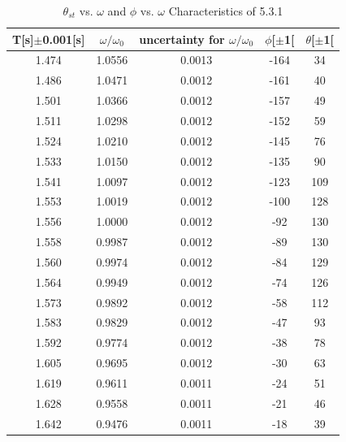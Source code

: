 \documentclass[12pt,a4paper]{article}
\begin{document}
\begin{table}[H]
    \centering
    \begin{tabular}{|c|c|c|c|c|}
    \hline
    T[s]$\pm$0.001[s]& $\omega/\omega_0$ & uncertainty for $\omega/\omega_0$ & $\phi${[}\degree{]}$\pm$1{[}\degree{]} & $\theta${[}\degree{]}$\pm$1{[}\degree{]} \\ \hline
    1.474 & 1.0556& 0.0013& -164& 34   \\ \hline
    1.486 & 1.0471& 0.0012& -161& 40   \\ \hline
    1.501 & 1.0366& 0.0012& -157& 49   \\ \hline
    1.511 & 1.0298& 0.0012& -152& 59   \\ \hline
    1.524 & 1.0210& 0.0012& -145& 76   \\ \hline
    1.533 & 1.0150& 0.0012& -135& 90   \\ \hline
    1.541 & 1.0097& 0.0012& -123& 109  \\ \hline
    1.553 & 1.0019& 0.0012& -100& 128  \\ \hline
    1.556 & 1.0000& 0.0012& -92& 130  \\ \hline
    1.558 & 0.9987& 0.0012& -89& 130  \\ \hline
    1.560  & 0.9974& 0.0012& -84& 129  \\ \hline
    1.564 & 0.9949& 0.0012& -74& 126  \\ \hline
    1.573 & 0.9892& 0.0012& -58& 112  \\ \hline
    1.583 & 0.9829& 0.0012& -47& 93   \\ \hline
    1.592 & 0.9774& 0.0012& -38& 78   \\ \hline
    1.605 & 0.9695& 0.0012
    & -30& 63   \\ \hline
    1.619 & 0.9611& 0.0011
    & -24& 51   \\ \hline
    1.628 & 0.9558& 0.0011
    & -21& 46   \\ \hline
    1.642 & 0.9476& 0.0011
    & -18& 39   \\ \hline
    \end{tabular}
    \caption{$\theta_{st}$ vs. $\omega$ and $\phi$ vs. $\omega$ Characteristics of 5.3.1}
    \end{table}
\end{document}
